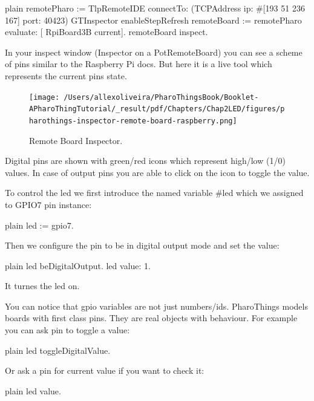 \documentclass[10pt,twoside,english]{_support/latex/sbabook/sbabook}
\begin{document}
\begin{displaycode}{plain}
remotePharo := TlpRemoteIDE connectTo: (TCPAddress ip: #[193 51 236 167] port: 40423)
GTInspector enableStepRefresh
remoteBoard := remotePharo evaluate: [ RpiBoard3B current].
remoteBoard inspect.
\end{displaycode}

In your inspect window (Inspector on a PotRemoteBoard) you can see a scheme of pins similar to the Raspberry Pi docs. But here it is a live tool which represents the current pins state.


\begin{figure}

\begin{center}
\texttt{[image: /Users/allexoliveira/PharoThingsBook/Booklet-APharoThingTutorial/\_result/pdf/Chapters/Chap2LED/figures/pharothings-inspector-remote-board-raspberry.png]}\caption{Remote Board Inspector.\label{remoteBoard}}\end{center}
\end{figure}


Digital pins are shown with green/red icons which represent high/low (1/0) values. In case of output pins you are able to click on the icon to toggle the value.

To control the led we first introduce the named variable \#led which we assigned to GPIO7 pin instance:

\begin{displaycode}{plain}
led := gpio7.
\end{displaycode}

Then we configure the pin to be in digital output mode and set the value:

\begin{displaycode}{plain}
led beDigitalOutput.
led value: 1.
\end{displaycode}

It turnes the led on.

You can notice that gpio variables are not just numbers/ids. PharoThings models boards with first class pins. They are real objects with behaviour. For example you can ask pin to toggle a value:

\begin{displaycode}{plain}
led toggleDigitalValue.
\end{displaycode}

Or ask a pin for current value if you want to check it:

\begin{displaycode}{plain}
led value.
\end{displaycode}
\end{document}
